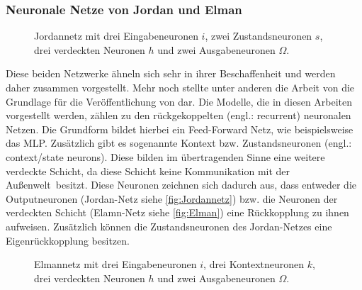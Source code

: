 \newpage

\subsubsection{Neuronale Netze von Jordan und Elman}%
\begin{figure}[!htb]
    \centering
        
    \caption[Darstellung eines Jordannetzes]{Jordannetz mit drei Eingabeneuronen $i$, zwei Zustandsneuronen $s$, drei verdeckten Neuronen $h$ und zwei Ausgabeneuronen $\Omega$.\,\protect\footnotemark{}}
    \label{fig:Jordannetz}
\end{figure}
\addtocounter{footnote}{-1}     %
\addtocounter{Hfootnote}{-1}    %
\wrapfigfoot{}

Diese beiden Netzwerke ähneln sich sehr in ihrer Beschaffenheit und werden daher zusammen vorgestellt. Mehr noch stellte unter anderen die Arbeit von \citet{Jordan1986} die Grundlage für die Veröffentlichung von \citet{Elman1990} dar. Die Modelle, die in diesen Arbeiten vorgestellt werden, zählen zu den rückgekoppelten (engl.: recurrent) neuronalen Netzen. Die Grundform bildet hierbei ein Feed-Forward Netz, wie beispielsweise das MLP. Zusätzlich gibt es sogenannte Kontext bzw. Zustandsneuronen (engl.: context/state neurons). Diese bilden im übertragenden Sinne eine weitere verdeckte Schicht, da diese Schicht keine Kommunikation mit der \glqq Außenwelt\grqq~besitzt. Diese Neuronen zeichnen sich dadurch aus, dass entweder die Outputneuronen (Jordan-Netz siehe \autoref{fig:Jordannetz}) bzw. die Neuronen der verdeckten Schicht (Elamn-Netz siehe \autoref{fig:Elman}) eine Rückkopplung zu ihnen aufweisen. Zusätzlich können die Zustandsneuronen des Jordan-Netzes eine Eigenrückkopplung besitzen. %

\begin{figure}[!htb]
    \centering
        
    \caption[Darstellung eines Elmannetzes]{Elmannetz mit drei Eingabeneuronen $i$, drei Kontextneuronen $k$, drei verdeckten Neuronen $h$ und zwei Ausgabeneuronen $\Omega$.\,\protect\footnotemark{}}
    \label{fig:Elman}
\end{figure}
\addtocounter{footnote}{-1}     %
\addtocounter{Hfootnote}{-1}    %
\wrapfigfoot{}

